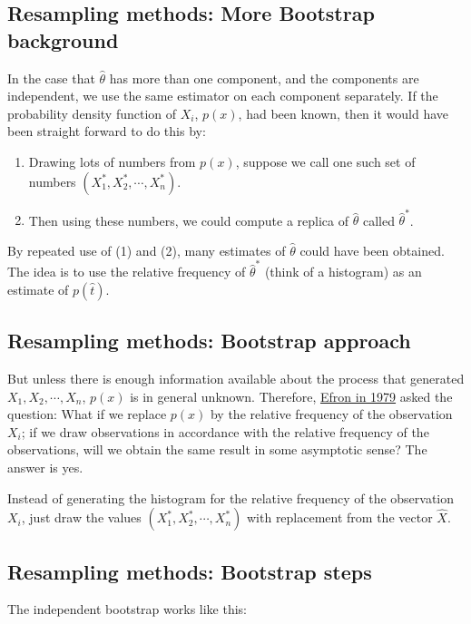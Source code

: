 \subsection*{Resampling methods: More Bootstrap background}

In the case that $\widehat{\theta}$ has
more than one component, and the components are independent, we use the
same estimator on each component separately.  If the probability
density function of $X_i$, $p(x)$, had been known, then it would have
been straight forward to do this by: 
\begin{enumerate}
\item Drawing lots of numbers from $p(x)$, suppose we call one such set of numbers $(X_1^*, X_2^*, \cdots, X_n^*)$. 

\item Then using these numbers, we could compute a replica of $\widehat{\theta}$ called $\widehat{\theta}^*$. 
\end{enumerate}

\noindent
By repeated use of (1) and (2), many
estimates of $\widehat{\theta}$ could have been obtained. The
idea is to use the relative frequency of $\widehat{\theta}^*$
(think of a histogram) as an estimate of $p(\hat{t})$.

\subsection*{Resampling methods: Bootstrap approach}

But
unless there is enough information available about the process that
generated $X_1,X_2,\cdots,X_n$, $p(x)$ is in general
unknown. Therefore, \href{{https://projecteuclid.org/euclid.aos/1176344552}}{Efron in 1979}  asked the
question: What if we replace $p(x)$ by the relative frequency
of the observation $X_i$; if we draw observations in accordance with
the relative frequency of the observations, will we obtain the same
result in some asymptotic sense? The answer is yes.

Instead of generating the histogram for the relative
frequency of the observation $X_i$, just draw the values
$(X_1^*,X_2^*,\cdots,X_n^*)$ with replacement from the vector
$\hat{X}$. 

\subsection*{Resampling methods: Bootstrap steps}

The independent bootstrap works like this: 

